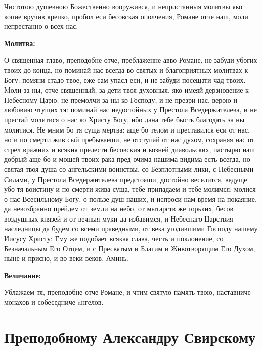 Чистотою душевною Божественно вооружився, и непристанныя молитвы яко копие вручив крепко, пробол еси бесовская ополчения, Романе отче наш, моли непрестанно о всех нас.


\medskip
\bfseries Молитва:\normalfont{}


О священная главо, преподобне отче, преблаженне авво Романе, не забуди убогих твоих до конца, но поминай нас всегда во святых и благоприятных молитвах к Богу: помяни стадо твое, еже сам упасл еси, и не забуди посещати чад твоих. Mоли за ны, отче священный, за дети твоя духовныя, яко имеяй дерзновение к Небесному Царю: не премолчи за ны ко Господу, и не презри нас, верою и любовию чтущих тя: поминай нас недостойных у Престола Вседержителева, и не престай молитися о нас ко Христу Богу, ибо дана тебе бысть благодать за ны молитися. Не мним бо тя суща мертва: аще бо телом и преставился еси от нас, но и по смерти жив сый пребываеши, не отступай от нас духом, сохраняя нас от стрел вражиих и всякия прелести бесовския и козней диавольских, пастырю наш добрый аще бо и мощей твоих рака пред очима нашима видима есть всегда, но святая твоя душа со ангельскими воинствы, со Безплотными лики, с Небесными Силами, у Престола Вседержителева предстояши, достойно веселится, ведуще убо тя воистину и по смерти жива суща, тебе припадаем и тебе молимся: молися о нас Всесильному Богу, о пользе душ наших, и испроси нам время на покаяние, да невозбранно прейдем от земли на небо, от мытарств же горьких, бесов воздушных князей и от вечныя муки да избавимся, и Небеснаго Царствия наследницы да будем со всеми праведными, от века угодившими Господу нашему Иисусу Христу: Ему же подобает всякая слава, честь и поклонение, со Безначальным Его Отцем, и с Пресвятым и Благим и Животворящим Его Духом, ныне и присно, и во веки веков. Аминь.


\medskip
\bfseries Величание:\normalfont{}


Ублажаем тя, преподобне отче Романе, и чтим святую память твою, наставниче монахов и собеседниче aнгелов.

\longpage[2]{}\mychapterending


 

\section{Преподобному Александру Свирскому}
 
